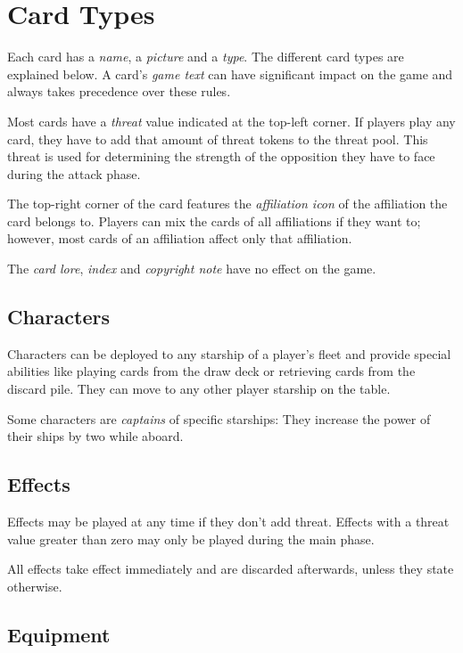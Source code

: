 \documentclass[11pt, a4paper]{article}
\begin{document}
\section{Card Types}

Each card has a \emph{name}, a \emph{picture} and a \emph{type}. The different
card types are explained below. A card's \emph{game text} can have significant
impact on the game and always takes precedence over these rules.

Most cards have a \emph{threat} value indicated at the top-left corner. If
players play any card, they have to add that amount of threat tokens to the
threat pool. This threat is used for determining the strength of the opposition
they have to face during the attack phase.

The top-right corner of the card features the \emph{affiliation icon} of the
affiliation the card belongs to. Players can mix the cards of all affiliations
if they want to; however, most cards of an affiliation affect only that
affiliation.

The \emph{card lore}, \emph{index} and \emph{copyright note} have no effect on
the game.

\subsection{Characters}

Characters can be deployed to any starship of a player's fleet and provide
special abilities like playing cards from the draw deck or retrieving cards from
the discard pile. They can move to any other player starship on the table.

Some characters are \emph{captains} of specific starships: They increase the
power of their ships by two while aboard.

\subsection{Effects}

Effects may be played at any time if they don't add threat. Effects with a
threat value greater than zero may only be played during the main phase.

All effects take effect immediately and are discarded afterwards, unless they
state otherwise.

\subsection{Equipment}
\end{document}
